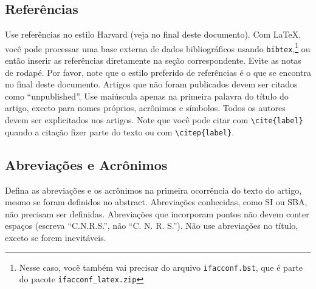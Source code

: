 \subsection{Referências}

Use referências no estilo Harvard (veja no final deste documento). Com
\LaTeX, você pode processar uma base externa de dados bibliográficos 
usando \texttt{bibtex},\footnote{Nesse caso, você também vai precisar do arquivo \texttt{ifacconf.bst}, que é parte do pacote \texttt{ifacconf\_latex.zip}} ou então inserir
as referências diretamente na seção correspondente. Evite as notas de rodapé.
Por favor, note que o estilo preferido de referências é o que se encontra no
final deste documento. Artigos que não foram publicados devem ser citados 
como ``unpublished''. Use maiúscula apenas na primeira palavra do título
do artigo, exceto para nomes próprios, acrônimos e símbolos. Todos os autores
devem ser explicitados nos artigos. Note que você pode citar com \texttt{\textbackslash cite\{label\}} quando a citação fizer parte do texto ou com \texttt{\textbackslash citep\{label\}}.


\subsection{Abreviações e Acrônimos}

Defina as abreviações e os acrônimos na primeira ocorrência do texto do artigo, 
mesmo se foram definidos no abstract. Abreviações conhecidas, como SI ou SBA, não
precisam ser definidas. Abreviações que incorporam pontos não devem conter espaços
(escreva ``C.N.R.S.'', não ``C. N. R. S.''). Não use abreviações no título, exceto
se forem inevitáveis. 

